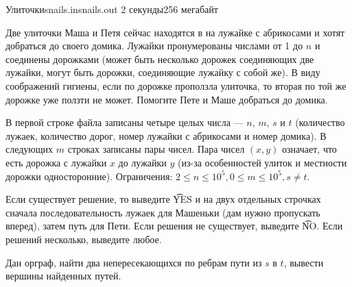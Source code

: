 
\begin{problem}{Улиточки}{snails.in}{snails.out}
{2 секунды}{256 мегабайт}

Две улиточки Маша и Петя сейчас находятся в на лужайке с абрикосами и хотят добраться до своего домика.
Лужайки пронумерованы числами от 1 до $n$ и соединены дорожками (может быть несколько дорожек соединяющих две лужайки,
могут быть дорожки, соединяющие лужайку с собой же).
В виду соображений гигиены, если по дорожке проползла улиточка, то вторая по той же дорожке уже ползти не может.
Помогите Пете и Маше добраться до домика.

\InputFile

В первой строке файла записаны четыре целых числа --- $n$, $m$, $s$ и $t$
(количество лужаек, количество дорог, номер лужайки с абрикосами и номер домика).
В следующих $m$ строках записаны пары чисел. Пара чисел $(x, y)$ означает,
что есть дорожка с лужайки $x$ до лужайки $y$ (из-за особенностей улиток и местности дорожки односторонние).
Ограничения:  $2 \le n \le 10^5, 0 \le m \le 10^5, s \not= t$.

\OutputFile

Если существует решение, то выведите \t{YES} и
на двух отдельных строчках сначала последовательность лужаек
для Машеньки (дам нужно пропускать вперед),
затем путь для Пети.
Если решения не существует, выведите \t{NO}. Если решений несколько, выведите любое.

\Example

\begin{example}
%
\end{example}

\Note

Дан орграф, найти два непересекающихся по ребрам пути из $s$ в $t$, вывести вершины найденных путей.

\end{problem}
